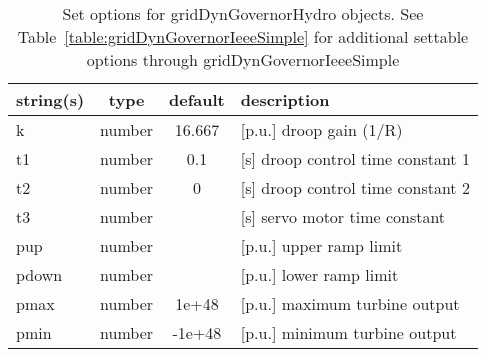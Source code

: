 \begin{table}[ht]
\centering
\begin{tabular}{p{5cm} c c p{7cm}}
\hline
string(s) & type & default & description \\
\hline
k & number & 16.667 & [p.u.] droop gain (1/R)\\
t1 & number & 0.1 & [s]   droop control time constant 1\\
t2 & number & 0 & [s]   droop control  time constant 2\\
t3 & number &  & [s]    servo motor time constant\\
pup & number &  & [p.u.] upper ramp limit\\
pdown & number &  & [p.u.] lower ramp limit\\
pmax & number & 1e+48 & [p.u.] maximum turbine output\\
pmin & number & -1e+48 & [p.u.] minimum turbine output\\
\hline
\end{tabular}
\caption{Set options for gridDynGovernorHydro objects. See Table~\ref{table:gridDynGovernorIeeeSimple} for additional settable options through gridDynGovernorIeeeSimple}
\label{table:gridDynGovernorHydro}
\end{table}


